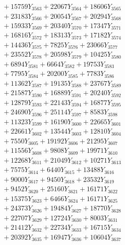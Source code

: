 \documentclass[a4paper,10pt]{article}
\begin{document}
{\begin{align}
&\;  + 15759 Y_{3563} + 22067 Y_{3564} + 18606 Y_{3565} \\[0.3ex]
&\;  + 23183 Y_{3566} + 20054 Y_{3567} + 20294 Y_{3568} \\[0.5ex]\allowbreak
&\;  + 15933 Y_{3569} + 20340 Y_{3570} + 17347 Y_{3571} \\[0.3ex]
&\;  + 16816 Y_{3572} + 18313 Y_{3573} + 17182 Y_{3574} \\[0.3ex]
&\;  + 14436 Y_{3575} + 7825 Y_{3576} + 23066 Y_{3577} \\[0.3ex]
&\;  + 23552 Y_{3578} + 20598 Y_{3579} + 10425 Y_{3580} \\[0.3ex]
&\;  + 6894 Y_{3581} + 6664 Y_{3582} + 19753 Y_{3583} \\[0.3ex]
&\;  + 7795 Y_{3584} + 20200 Y_{3585} + 7783 Y_{3586} \\[0.3ex]
&\;  + 11362 Y_{3587} + 19135 Y_{3588} + 23767 Y_{3589} \\[0.3ex]
&\;  + 21587 Y_{3590} + 16889 Y_{3591} + 20240 Y_{3592} \\[0.3ex]
&\;  + 12879 Y_{3593} + 22143 Y_{3594} + 16877 Y_{3595} \\[0.3ex]
&\;  + 24690 Y_{3596} + 25114 Y_{3597} + 8583 Y_{3598} \\[0.5ex]\allowbreak
&\;  + 11323 Y_{3599} + 16190 Y_{3600} + 22665 Y_{3601} \\[0.3ex]
&\;  + 22661 Y_{3602} + 13544 Y_{3603} + 12810 Y_{3604} \\[0.3ex]
&\;  + 7550 Y_{3605} + 19192 Y_{3606} + 21295 Y_{3607} \\[0.3ex]
&\;  + 11556 Y_{3608} + 9808 Y_{3609} + 19971 Y_{3610} \\[0.3ex]
&\;  + 12268 Y_{3611} + 21049 Y_{3612} + 10271 Y_{3613} \\[0.3ex]
&\;  + 7575 Y_{3614} + 6440 Y_{3615} + 13488 Y_{3616} \\[0.3ex]
&\;  + 9000 Y_{3617} + 9450 Y_{3618} + 23532 Y_{3619} \\[0.3ex]
&\;  + 9452 Y_{3620} + 25160 Y_{3621} + 16171 Y_{3622} \\[0.3ex]
&\;  + 15375 Y_{3623} + 6466 Y_{3624} + 16171 Y_{3625} \\[0.3ex]
&\;  + 24373 Y_{3626} + 19484 Y_{3627} + 18770 Y_{3628} \\[0.5ex]\allowbreak
&\;  + 22707 Y_{3629} + 12724 Y_{3630} + 8003 Y_{3631} \\[0.3ex]
&\;  + 21412 Y_{3632} + 22734 Y_{3633} + 16715 Y_{3634} \\[0.3ex]
&\;  + 20392 Y_{3635} + 16947 Y_{3636} + 10604 Y_{3637} \\[0.3ex]

\end{align}}
\end{document}
